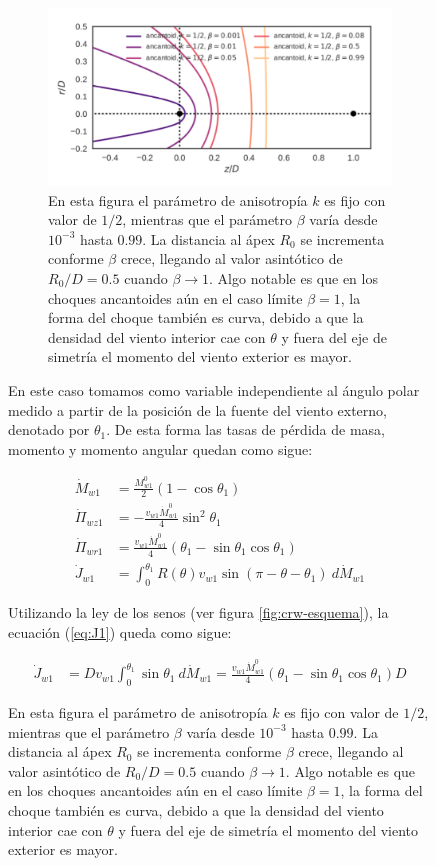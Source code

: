 \begin{figure}
\begin{figure}
\centering
  \ContinuedFloat
    \captionsetup{list=off,format=cont}
    \includegraphics[width=0.8\linewidth]{./Figures/ancantoid-shape}
    \caption{En esta figura el parámetro de anisotropía $k$ es fijo con valor de $1/2$, mientras que el parámetro $\beta$ varía desde $10^{-3}$ hasta $0.99$. La distancia al ápex $R_0$ se incrementa conforme $\beta$ crece, llegando al valor asintótico de $R_0/D = 0.5$ cuando $\beta\to 1$. Algo notable es que en los choques ancantoides aún en el caso límite $\beta=1$, la forma del choque también es curva, debido a que la densidad del viento interior cae con $\theta$ y fuera del eje de simetría el momento del viento exterior es mayor.}
    \label{fig:CRW-shape-2}
\end{figure}


En este caso tomamos como variable independiente al ángulo polar medido a partir de la posición de la fuente del viento externo, denotado por $\theta_1$. De esta forma las tasas de pérdida de masa, momento y momento angular quedan como sigue:

\begin{align}
  \dot{M}_{w1} &= \frac{M^0_{w1}}{2}\left(1 - \cos\theta_1\right) \label{eq:c-dotm}\\
  \dot{\Pi}_{wz1} &= -\frac{v_{w1}\dot{M}^0_{w1}}{4}\sin^2\theta_1\\
  \dot{\Pi}_{wr1} &= \frac{v_{w1}\dot{M}^0_{w1}}{4}\left(\theta_1 - \sin\theta_1\cos\theta_1\right)\\
  \dot{J}_{w1} &= \int^{\theta_1}_0 R(\theta)v_{w1}\sin(\pi-\theta-\theta_1)~d\dot{M}_{w1} \label{eq:J1}
\end{align}

Utilizando la ley de los senos (ver figura \ref{fig:crw-esquema}), la ecuación (\ref{eq:J1}) queda como sigue:

\begin{align}
  \dot{J}_{w1} &= Dv_{w1}\int^{\theta_1}_0 \sin\theta_1~d\dot{M}_{w1} =
                 \frac{v_{w1}\dot{M}^0_{w1}}{4}\left(\theta_1 - \sin\theta_1\cos\theta_1\right) D \label{eq:J1-iso}
\end{align}


\end{figure}
